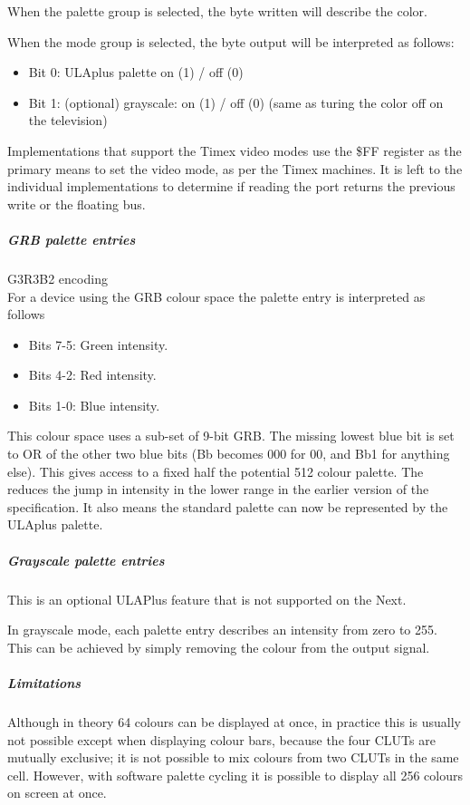 When the palette group is selected, the byte written will describe the
color.

When the mode group is selected, the byte output will be interpreted
as follows:
\begin{itemize}
\item Bit 0: ULAplus palette on (1) / off (0)
\item Bit 1: (optional) grayscale: on (1) / off (0) (same as turing
  the color off on the television)
\end{itemize}

Implementations that support the Timex video modes use the \$FF
register as the primary means to set the video mode, as per the Timex
machines. It is left to the individual implementations to determine if
reading the port returns the previous write or the floating bus.

\subparagraph{GRB palette entries}

G3R3B2 encoding\\
For a device using the GRB colour space the palette entry is
interpreted as follows
\begin{itemize}
\item Bits 7-5: Green intensity.
\item Bits 4-2: Red intensity.
\item Bits 1-0: Blue intensity.
\end{itemize}

This colour space uses a sub-set of 9-bit GRB. The missing lowest blue
bit is set to OR of the other two blue bits (Bb becomes 000 for 00,
and Bb1 for anything else). This gives access to a fixed half the
potential 512 colour palette. The reduces the jump in intensity in the
lower range in the earlier version of the specification. It also means
the standard palette can now be represented by the ULAplus palette.

\subparagraph{Grayscale palette entries}
This is an optional ULAPlus feature that is not supported on the Next.

In grayscale mode, each palette entry describes an intensity from zero
to 255. This can be achieved by simply removing the colour from the
output signal.

\subparagraph{Limitations}
Although in theory 64 colours can be displayed at once, in practice
this is usually not possible except when displaying colour bars,
because the four CLUTs are mutually exclusive; it is not possible to
mix colours from two CLUTs in the same cell. However, with software
palette cycling it is possible to display all 256 colours on screen at
once.

